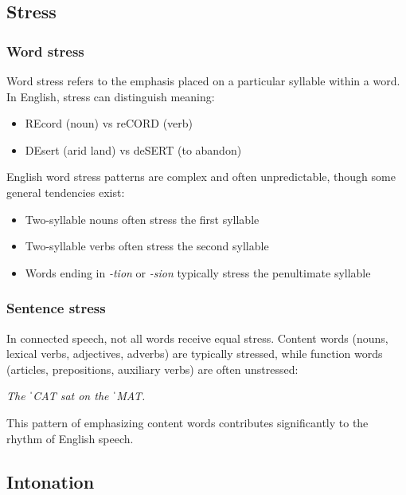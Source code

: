 \subsection{Stress}\label{sec:stress}

\subsubsection{Word stress}

Word stress refers to the emphasis placed on a particular syllable within a word. In English, stress can distinguish meaning:

\begin{itemize}[noitemsep]
    \item REcord (noun) vs reCORD (verb)
    \item DEsert (arid land) vs deSERT (to abandon)
\end{itemize}

English word stress patterns are complex and often unpredictable, though some general tendencies exist:

\begin{itemize}[noitemsep]
    \item Two-syllable nouns often stress the first syllable
    \item Two-syllable verbs often stress the second syllable
    \item Words ending in \textit{-tion} or \textit{-sion} typically stress the penultimate syllable
\end{itemize}

\subsubsection{Sentence stress}

In connected speech, not all words receive equal stress. Content words (nouns, lexical verbs, adjectives, adverbs) are typically stressed, while function words (articles, prepositions, auxiliary verbs) are often unstressed:

\ea \textit{The ˈCAT sat on the ˈMAT.}
\z

This pattern of emphasizing content words contributes significantly to the rhythm of English speech.

\subsection{Intonation}\label{sec:intonation}

